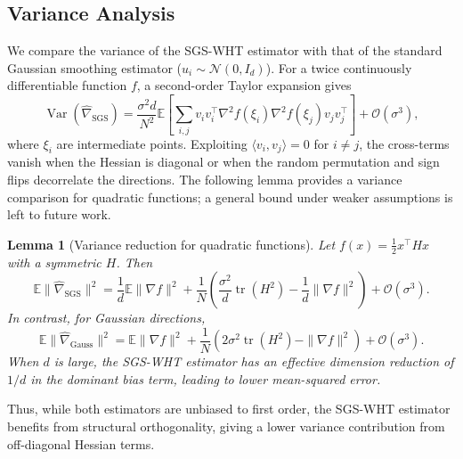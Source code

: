 \documentclass[11pt,a4paper]{article}
\newtheorem{lemma}{Lemma}
\begin{document}
\subsection{Variance Analysis}
We compare the variance of the SGS-WHT estimator with that of the standard Gaussian smoothing estimator ($u_i \sim \mathcal{N}(0,I_d)$). For a twice continuously differentiable function $f$, a second-order Taylor expansion gives
\begin{equation}
    \operatorname{Var}(\hat{\nabla}_{\text{SGS}}) = \frac{\sigma^2 d}{N^2} \mathbb{E}\!\left[ \sum_{i,j} v_i v_i^\top \nabla^2 f(\xi_i) \nabla^2 f(\xi_j) v_j v_j^\top \right] + \mathcal{O}(\sigma^3),
\end{equation}
where $\xi_i$ are intermediate points. Exploiting $\langle v_i, v_j \rangle = 0$ for $i \neq j$, the cross-terms vanish when the Hessian is diagonal or when the random permutation and sign flips decorrelate the directions. The following lemma provides a variance comparison for quadratic functions; a general bound under weaker assumptions is left to future work.
\begin{lemma}[Variance reduction for quadratic functions]
\label{lem:unbiased} 
Let $f(x) = \frac{1}{2} x^\top H x$ with a symmetric $H$. Then
\begin{equation}
    \mathbb{E}\|\hat{\nabla}_{\text{SGS}}\|^2 = \frac{1}{d} \mathbb{E}\|\nabla f\|^2 + \frac{1}{N} \left( \frac{\sigma^2}{d} \operatorname{tr}(H^2) - \frac{1}{d} \|\nabla f\|^2 \right) + \mathcal{O}(\sigma^3).
\end{equation}
In contrast, for Gaussian directions,
\begin{equation}
    \mathbb{E}\|\hat{\nabla}_{\text{Gauss}}\|^2 = \mathbb{E}\|\nabla f\|^2 + \frac{1}{N} \left( 2\sigma^2 \operatorname{tr}(H^2) - \|\nabla f\|^2 \right) + \mathcal{O}(\sigma^3).
\end{equation}
When $d$ is large, the SGS-WHT estimator has an effective dimension reduction of $1/d$ in the dominant bias term, leading to lower mean-squared error.
\end{lemma}
Thus, while both estimators are unbiased to first order, the SGS-WHT estimator benefits from structural orthogonality, giving a lower variance contribution from off-diagonal Hessian terms.
\end{document}
